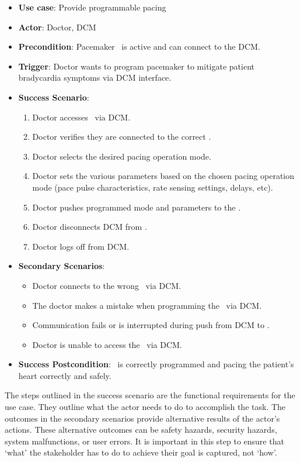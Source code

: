 \begin{itemize}
	\item \textbf{Use case}: Provide programmable pacing
	\item \textbf{Actor}: Doctor, DCM
	\item \textbf{Precondition}: Pacemaker \pgd\ is active and can connect to the DCM.
	\item \textbf{Trigger}: Doctor wants to program pacemaker to mitigate patient bradycardia symptoms via DCM interface.
	\item \textbf{Success Scenario}:
	\begin{enumerate}
		\item Doctor accesses \pgd\ via DCM.
		\item Doctor verifies they are connected to the correct \pgd.
		\item Doctor selects the desired pacing operation mode.
		\item Doctor sets the various parameters based on the chosen pacing operation mode (pace pulse characteristics, rate sensing settings, delays, etc).
		\item Doctor pushes programmed mode and parameters to the \pgd.
		\item Doctor disconnects DCM from \pgd.
		\item Doctor logs off from DCM.
	\end{enumerate}
	\item \textbf{Secondary Scenarios}:
	\begin{itemize}
		\item Doctor connects to the wrong \pgd\ via DCM.
		\item The doctor makes a mistake when programming the \pgd\ via DCM.
		\item Communication fails or is interrupted during push from DCM to \pgd.
		\item Doctor is unable to access the \pgd\ via DCM.
	\end{itemize}
	\item \textbf{Success Postcondition}: \pgd\ is correctly programmed and pacing the patient's heart correctly and safely.
\end{itemize}

The steps outlined in the success scenario are the functional requirements for the use case. They outline what the actor needs to do to accomplish the task. The outcomes in the secondary scenarios provide alternative results of the actor's actions. These alternative outcomes can be safety hazards, security hazards, system malfunctions, or user errors. It is important in this step to ensure that `what' the stakeholder has to do to achieve their goal is captured, not `how'.

